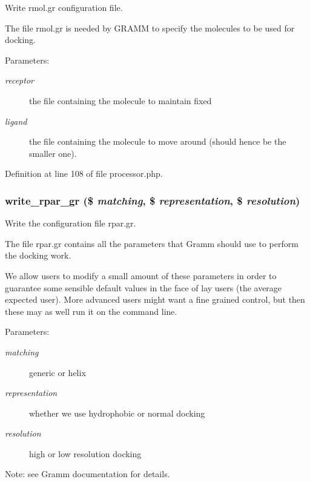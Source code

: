 Write rmol.gr configuration file. 

The file rmol.gr is needed by GRAMM to specify the molecules to be used for docking.

\begin{Desc}
\item[Parameters:]
\begin{description}
\item[{\em receptor}]the file containing the molecule to maintain fixed \item[{\em ligand}]the file containing the molecule to move around (should hence be the smaller one). \end{description}
\end{Desc}


Definition at line 108 of file processor.php.
\subsubsection{\setlength{\rightskip}{0pt plus 5cm}write\_\-rpar\_\-gr (\$ {\em matching}, \$ {\em representation}, \$ {\em resolution})}\label{processor_8php_a12}


Write the configuration file rpar.gr. 

The file rpar.gr contains all the parameters that Gramm should use to perform the docking work.

We allow users to modify a small amount of these parameters in order to guarantee some sensible default values in the face of lay users (the average expected user). More advanced users might want a fine grained control, but then these may as well run it on the command line.

\begin{Desc}
\item[Parameters:]
\begin{description}
\item[{\em matching}]generic or helix \item[{\em representation}]whether we use hydrophobic or normal docking \item[{\em resolution}]high or low resolution docking\end{description}
\end{Desc}
\begin{Desc}
\item[Note:]see Gramm documentation for details. \end{Desc}


